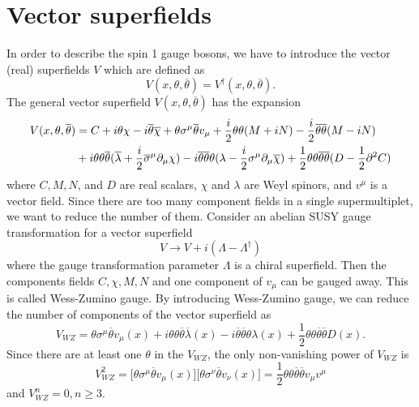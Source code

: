 \documentclass[12pt]{report}
\begin{document}
\section{Vector superfields}
In order to describe the spin 1 gauge bosons, we have to introduce the vector (real) superfields $V$ which are defined as
\begin{equation}
V(x, \theta, \overline{\theta}) = V^{\dag} (x, \theta, \overline{\theta}) .
\end{equation}
The general vector superfield $V(x, \theta, \overline{\theta})$ has the expansion
\begin{align}
V(x, \theta, \overline{\theta}) &= C + i \theta \chi - i \overline{\theta} \overline{\chi} + \theta \sigma^{\mu} \overline{\theta} v_{\mu} + \frac{i}{2} \theta \theta (M + iN) - \frac{i}{2} \overline{\theta} \overline{\theta} (M - iN) \notag \\
& + i \theta \theta \overline{\theta} (\overline{\lambda} + \frac{i}{2} \overline{\sigma}^{\mu} \partial_{\mu} \chi ) - i \overline{\theta} \overline{\theta} \theta (\lambda - \frac{i}{2} \sigma^{\mu} \partial_{\mu} \overline{\chi}) + \frac{1}{2} \theta \theta \overline{\theta} \overline{\theta} (D - \frac{1}{2} \partial^{2} C)
\end{align}
where $C, M, N$, and $D$ are real scalars, $\chi$ and $\lambda$ are Weyl spinors, and $v^{\mu}$ is a vector field.
Since there are too many component fields in a single supermultiplet, we want to reduce the number of them.
Consider an abelian SUSY gauge transformation for a vector superfield
\begin{equation}
V \to V + i (\Lambda - \Lambda^{\dag})
\end{equation}
where the gauge transformation parameter $\Lambda$ is a chiral superfield. Then the components fields $C, \chi, M, N$ and one component of $v_{\mu}$ can be gauged away.
This is called Wess-Zumino gauge.
By introducing Wess-Zumino gauge, we can reduce the number of components of the vector superfield as
\begin{equation} \label{eq: WZ gauge vector superfield}
V_{WZ} = \theta \sigma^{\mu} \overline{\theta} v_{\mu}(x) + i \theta \theta \overline{\theta} \overline{\lambda}(x) - i \overline{\theta} \overline{\theta} \theta \lambda(x) + \frac{1}{2} \theta \theta \overline{\theta} \overline{\theta} D(x) .
\end{equation}
Since there are at least one $\theta$ in the $V_{WZ}$, the only non-vanishing power of $V_{WZ}$ is
\begin{equation}
V^{2}_{WZ} = \big[ \theta \sigma^{\mu} \overline{\theta} v_{\mu}(x) \big] \big[ \theta \sigma^{\nu} \overline{\theta} v_{\nu}(x) \big] = \frac{1}{2} \theta \theta \overline{\theta} \overline{\theta} v_{\mu} v^{\mu}
\end{equation}
and $V^{n}_{WZ} = 0, n \ge 3$.
\end{document}
